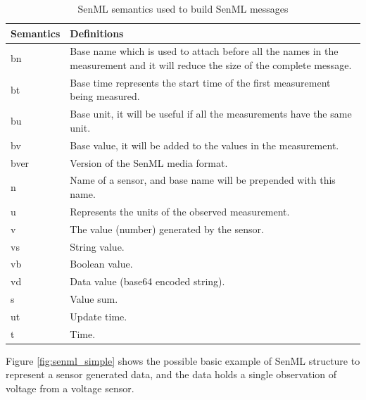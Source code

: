     
    \begin{table}[h!]
    		\begin{tabular}{|l|p{12cm}|} %
    			\hline
    			\textbf{Semantics} & \textbf{Definitions}\\
    			\hline
    			
    			bn & Base name which is used to attach before all the names in the measurement and it will reduce the size of the complete message. \\
    			\hline
    			bt & Base time represents the start time of the first measurement being measured.\\
    			\hline
    			bu &	Base unit, it will be useful if all the measurements have the same unit.\\
    			\hline
    			bv &	Base value, it will be added to the values in the measurement.\\
    			\hline
    			bver &	Version of the SenML media format.\\
    			\hline
    			n &	Name of a sensor, and base name will be prepended with this name.\\
    			\hline
    			u &	Represents the units of the observed measurement.\\
				\hline
    			v &	The value (number) generated by the sensor.\\
    			\hline
    			vs &	String value.\\
    			\hline
    			vb &	Boolean value.\\
    			\hline
    			vd &	Data value (base64 encoded string).\\
    			\hline
    			s &	Value sum.\\
    			\hline
    			ut &	Update time.\\
    			\hline
    			t &	Time.\\
    			\hline
    		\end{tabular}
    	    \caption{SenML semantics used to build SenML messages}
	    	\label{tab:senml_semantics}
    \end{table}
    
     Figure \ref{fig:senml_simple} shows the possible basic example of SenML structure to represent a sensor generated data, and the data holds a single observation of voltage from a voltage sensor.
    
